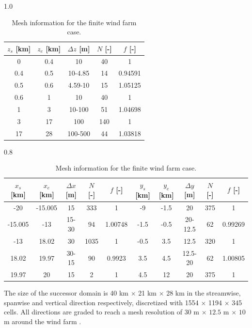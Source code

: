 \documentclass[journal abbreviation, manuscript]{copernicus}
\begin{document}
\begin{table}[H]
	\begin{center}
	\begin{subtable}[t]{1.0\textwidth}
		\centering
		\begin{tabular}[t]{c c c c c} 
			\hline
			$z_s$ [km] & $z_e$ [km] & $\Delta z$ [m] & $N$ [-] & $f$ [-]\\
			\hline
			0 & 0.4 & 10 & 40 & 1 \\
			0.4 & 0.5 & 10-4.85 & 14 & 0.94591 \\
			0.5 & 0.6 & 4.59-10 & 15 & 1.05125 \\
		    0.6 & 1 & 10 & 40 & 1\\
			1 & 3 & 10-100 & 51 & 1.04698 \\
			3 & 17 & 100 & 140 & 1 \\
			17 & 28 & 100-500 & 44 & 1.03818 \\
			\hline
		\end{tabular}
		\caption{Vertical discretization parameters.}
	\end{subtable}
	\newline
	\newline 
	\begin{subtable}[t]{0.8\textwidth}
		\centering
		\begin{tabular}[t]{c c c c c | c c c c c} 
			\hline
			$x_s$ [km] & $x_e$ [km] & $\Delta x$ [m] & $N$ [-] & $f$ [-] & $y_s$ [km] & $y_e$ [km] & $\Delta y$ [m] & $N$ [-] & $f$ [-] \\
			\hline
			-20 & -15.005 & 15 & 333 & 1 & -9 & -1.5 & 20 & 375 & 1 \\
			-15.005 & -13 & 15-30 & 94 & 1.00748 & -1.5 & -0.5 & 20-12.5 & 62 & 0.99269\\
			-13 & 18.02 & 30 & 1035 & 1 & -0.5 & 3.5 & 12.5 & 320 & 1 \\
			18.02 & 19.97 & 30-15 & 90 & 0.9923 & 3.5 & 4.5 & 12.5-20 & 62 & 1.00805 \\
			19.97 & 20 & 15 & 2 & 1 & 4.5 & 12 & 20 & 375 & 1 \\
			\hline
		\end{tabular}
		\caption{Streamwise (left) and spanwise (right) discretization parameters.}
	\end{subtable}
	\end{center}
	\caption{Mesh information for the finite wind farm case. }
	\label{tab:finiteWindFarm_1}
\end{table}
The size of the successor domain is 40 km $\times$ 21 km $\times$ 28 km in the streamwise, spanwise and vertical direction respectively, discretized with 1554 $\times$ 1194 $\times$ 345 cells. All directions are graded to reach a mesh resolution of $30$ m $\times$ $12.5$ m $\times$ $10$ m around the wind farm . 
\end{document}
